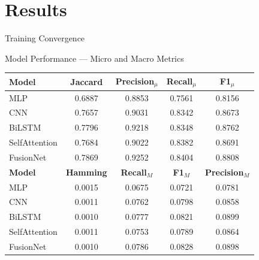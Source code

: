 \section{Results}

\begin{frame}{Training Convergence}
  
\end{frame}

\begin{frame}{Model Performance — Micro and Macro Metrics}
\begin{table}[]
\begin{tabular}{@{}lcccc@{}}
\toprule
\textbf{Model} & \textbf{Jaccard} & \textbf{Precision$_\mu$} & \textbf{Recall$_\mu$} & \textbf{F1$_\mu$}      \\ \midrule
MLP            & 0.6887           & 0.8853                   & 0.7561                & 0.8156                 \\
CNN            & 0.7657           & 0.9031                   & 0.8342                & 0.8673                 \\
BiLSTM         & 0.7796           & 0.9218                   & 0.8348                & 0.8762                 \\
SelfAttention  & 0.7684           & 0.9022                   & 0.8382                & 0.8691                 \\
FusionNet      & 0.7869           & 0.9252                   & 0.8404                & 0.8808                 \\ \midrule
\textbf{Model} & \textbf{Hamming} & \textbf{Recall$_M$}      & \textbf{F1$_M$}       & \textbf{Precision$_M$} \\ \midrule
MLP            & 0.0015           & 0.0675                   & 0.0721                & 0.0781                 \\
CNN            & 0.0011           & 0.0762                   & 0.0798                & 0.0858                 \\
BiLSTM         & 0.0010           & 0.0777                   & 0.0821                & 0.0899                 \\
SelfAttention  & 0.0011           & 0.0753                   & 0.0789                & 0.0864                 \\
FusionNet      & 0.0010           & 0.0786                   & 0.0828                & 0.0898                 \\ \bottomrule
\end{tabular}
\end{table}
\end{frame}

